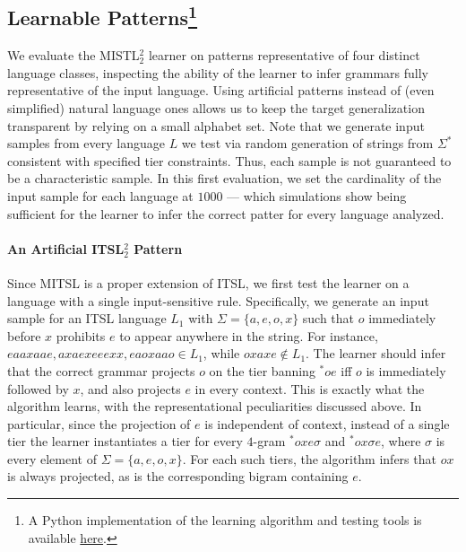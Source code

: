 \documentclass[11pt,a4paper]{article}
\begin{document}
\subsection{Learnable Patterns\footnote{A Python implementation of the learning algorithm and testing tools is available  \href{https://github.com/alenaks/2IMTSL}{here}.}}

We evaluate the  MISTL$^2_2$ learner on patterns representative of  four distinct  language classes,  inspecting the ability of the learner to infer grammars fully representative of the input language.
Using artificial patterns instead of (even simplified) natural language ones allows us to keep the target generalization transparent by relying on a small alphabet set.
Note that we generate input samples from every language $L$ we test via random generation of strings from $\Sigma^*$ consistent with specified tier constraints.
Thus, each sample is not guaranteed to be a characteristic sample.
In this first evaluation, we set the cardinality of the input sample for each language at $1000$ --- which simulations show being sufficient for the learner to infer the correct patter for every language analyzed.


\paragraph{An Artificial ITSL$^2_2$ Pattern} Since MITSL is a proper extension of ITSL, we first test the learner on a language with a single input-sensitive rule.  Specifically, we generate an input sample for an ITSL language $L_1$ with $\Sigma = \{a, e, o, x\}$ such that $o$ immediately before $x$ prohibits $e$ to appear anywhere in the string. 
For instance,  $eaaxaae,axaexeeexx,eaoxaao \in L_1$, while $oxaxe \notin L_1$.
The learner should infer that the correct grammar projects $o$ on the tier banning $^*oe$ iff $o$ is immediately followed by $x$, and also projects $e$ in every context.
This is exactly what the algorithm learns, with the representational peculiarities discussed above.
In particular, since the projection of $e$ is independent of context, instead of a single tier the learner instantiates a tier for every $4$-gram  $^*oxe\sigma$ and   $^*ox\sigma e$, where $\sigma$ is every element of $\Sigma = \{a, e, o, x\}$.
For each such tiers, the algorithm infers that $ox$ is always projected, as is the corresponding bigram containing $e$.
\end{document}
